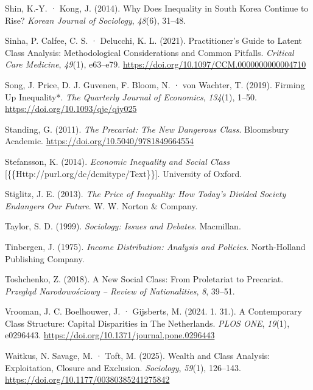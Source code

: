 \documentclass[
  letterpaper,
  DIV=11,
  numbers=noendperiod]{scrartcl}
\newlength{\cslhangindent}
\newenvironment{CSLReferences}[2] %
 {\begin{list}{}{%
  \setlength{\itemindent}{0pt}
  \setlength{\leftmargin}{0pt}
  \setlength{\parsep}{0pt}
  \ifodd #1
   \setlength{\leftmargin}{\cslhangindent}
   \setlength{\itemindent}{-1\cslhangindent}
  \fi
  \setlength{\itemsep}{#2\baselineskip}}}
 {\end{list}}
\begin{document}
\begin{CSLReferences}{1}{0}
Shin, K.-Y. · Kong, J. (2014). Why {Does Inequality} in {South Korea
Continue} to {Rise}? \emph{Korean Journal of Sociology}, \emph{48}(6),
31--48.

Sinha, P. Calfee, C. S. · Delucchi, K. L. (2021). Practitioner's {Guide}
to {Latent Class Analysis}: {Methodological Considerations} and {Common
Pitfalls}. \emph{Critical Care Medicine}, \emph{49}(1), e63--e79.
\url{https://doi.org/10.1097/CCM.0000000000004710}

Song, J. Price, D. J. Guvenen, F. Bloom, N. · von Wachter, T. (2019).
Firming {Up Inequality}*. \emph{The Quarterly Journal of Economics},
\emph{134}(1), 1--50. \url{https://doi.org/10.1093/qje/qjy025}

Standing, G. (2011). \emph{The {Precariat}: {The New Dangerous Class}}.
Bloomsbury Academic. \url{https://doi.org/10.5040/9781849664554}

Stefansson, K. (2014). \emph{Economic Inequality and Social Class}
{[}\{\{Http://purl.org/dc/dcmitype/Text\}\}{]}. University of Oxford.

Stiglitz, J. E. (2013). \emph{The {Price} of {Inequality}: {How Today}'s
{Divided Society Endangers Our Future}}. W. W. Norton \& Company.

Taylor, S. D. (1999). \emph{Sociology: {Issues} and {Debates}}.
Macmillan.

Tinbergen, J. (1975). \emph{Income {Distribution}: {Analysis} and
{Policies}}. North-Holland Publishing Company.

Toshchenko, Z. (2018). A {New Social Class}: {From Proletariat} to
{Precariat}. \emph{Przegląd Narodowościowy -- Review of Nationalities},
\emph{8}, 39--51.

Vrooman, J. C. Boelhouwer, J. · Gijsberts, M. (2024. 1. 31.). A
Contemporary Class Structure: {Capital} Disparities in {The
Netherlands}. \emph{PLOS ONE}, \emph{19}(1), e0296443.
\url{https://doi.org/10.1371/journal.pone.0296443}

Waitkus, N. Savage, M. · Toft, M. (2025). Wealth and {Class Analysis}:
{Exploitation}, {Closure} and {Exclusion}. \emph{Sociology},
\emph{59}(1), 126--143. \url{https://doi.org/10.1177/00380385241275842}


\end{CSLReferences}
\end{document}
